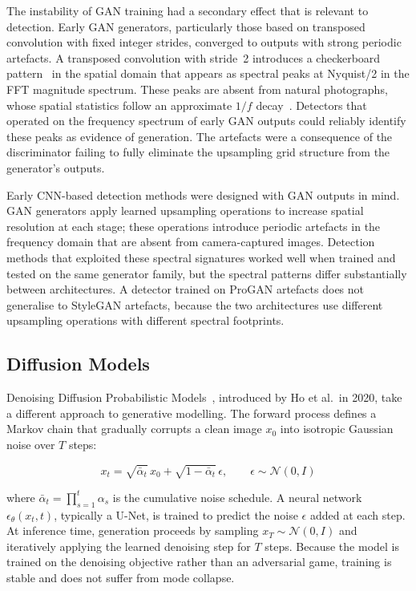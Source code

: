 The instability of GAN training had a secondary effect that is relevant to detection. Early
GAN generators, particularly those based on transposed convolution with fixed integer
strides, converged to outputs with strong periodic artefacts. A transposed convolution with
stride~2 introduces a checkerboard pattern~\cite{odena2016deconvolution} in the spatial domain that appears as spectral
peaks at Nyquist/2 in the FFT magnitude spectrum. These peaks are absent from natural
photographs, whose spatial statistics follow an approximate $1/f$ decay~\cite{ruderman1994statistics}. Detectors that
operated on the frequency spectrum of early GAN outputs could reliably identify these peaks
as evidence of generation. The artefacts were a consequence of the discriminator
failing to fully eliminate the upsampling grid structure from the generator's outputs.

Early CNN-based detection methods were designed with GAN outputs in mind. GAN generators
apply learned upsampling operations to increase spatial resolution at each stage; these
operations introduce periodic artefacts in the frequency domain that are absent from
camera-captured images. Detection methods that exploited these spectral signatures worked
well when trained and tested on the same generator family, but the spectral patterns differ
substantially between architectures. A detector trained on ProGAN artefacts does not
generalise to StyleGAN artefacts, because the two architectures use different upsampling
operations with different spectral footprints.

\subsection{Diffusion Models}
\label{subsec:diffusion_models}

Denoising Diffusion Probabilistic Models~\cite{ho2020}, introduced by Ho et al.\ in 2020,
take a different approach to generative modelling. The forward process defines a Markov
chain that gradually corrupts a clean image $x_0$ into isotropic Gaussian noise over $T$
steps:

\begin{equation}
  x_t = \sqrt{\bar{\alpha}_t}\, x_0 + \sqrt{1 - \bar{\alpha}_t}\, \epsilon,
  \qquad \epsilon \sim \mathcal{N}(0, I)
  \label{eq:ddpm_forward}
\end{equation}

where $\bar{\alpha}_t = \prod_{s=1}^t \alpha_s$ is the cumulative noise schedule. A
neural network $\epsilon_\theta(x_t, t)$, typically a U-Net, is trained to predict the
noise $\epsilon$ added at each step. At inference time, generation proceeds by sampling
$x_T \sim \mathcal{N}(0, I)$ and iteratively applying the learned denoising step for
$T$ steps. Because the model is trained on the denoising objective rather than an
adversarial game, training is stable and does not suffer from mode collapse.

